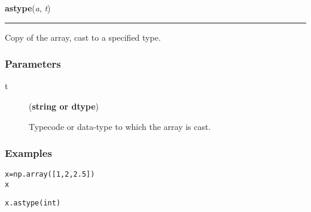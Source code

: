     \begin{boxedminipage}{\textwidth}

    \raggedright \textbf{astype}(\textit{a}, \textit{t})

    \vspace{-1.5ex}

    \rule{\textwidth}{0.5\fboxrule}

Copy of the array, cast to a specified type.



\hypertarget{parameters}{}
\subsubsection*{Parameters}
\begin{description}
\item[{t}] (\textbf{string or dtype})

Typecode or data-type to which the array is cast.

\end{description}



\hypertarget{examples}{}
\subsubsection*{Examples}
\begin{alltt}
\pysrcprompt{{\textgreater}{\textgreater}{\textgreater} }x = np.array([1, 2, 2.5])
\pysrcprompt{{\textgreater}{\textgreater}{\textgreater} }x
\end{alltt}
\begin{alltt}
\pysrcprompt{{\textgreater}{\textgreater}{\textgreater} }x.astype(int)
\end{alltt}
    \vspace{1ex}

    \end{boxedminipage}

    \label{numpy:ndarray:byteswap}

    \vspace{0.5ex}

